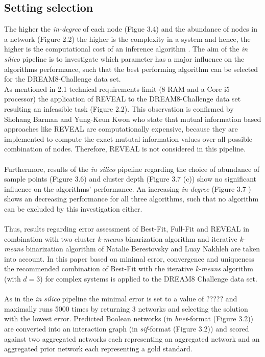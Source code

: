 \subsection*{Setting selection}
The higher the \textit{in-degree} of each node (Figue 3.4) and the abundance of nodes in a network (Figure 2.2) the higher is the complexity in a system and hence, the higher is the computational cost of an inference algorithm \citep{Barman.2017}. 
The aim of the \textit{in silico} pipeline is to investigate which parameter has a major influence on the algorithms performance, such that the best performing algorithm can be selected for the DREAM8-Challenge data set.\\
As mentioned in 2.1 technical requirements limit (8 RAM and a Core i5 processor) the application of REVEAL to the DREAM8-Challenge data set resulting an infeasible task (Figure 2.2). This observation is confirmed by Shohang Barman and Yung-Keun Kwon \citep{Barman.2017} who state that mutual information based approaches like REVEAL are computationally expensive, because they are implemented to compute the exact mututal information values over all possible combination of nodes. Therefore, REVEAL is not considered in this pipeline.\\\\

Furthermore, results of the \textit{in silico} pipeline regarding the choice of abundance of sample points (Figure 3.6) and cluster depth (Figure 3.7 (c)) show no significant influence on the algorithms' performance. An increasing \textit{in-degree} (Figure 3.7 ) shows an decreasing performance for all three algorithms, such that no algorithm can be excluded by this investigation either.\\\\
Thus, results regarding error assessment of Best-Fit, Full-Fit and REVEAL in combination with two cluster \textit{k-means} binarization algorithm and iterative \textit{k-means} binarization algorithm of Natalie Berestovsky and Luay Nakhleh are taken into account. In this paper based on minimal error, convergence and uniqueness the recommended combination of Best-Fit with the iterative \textit{k-means} algorithm (with $d=3$) for complex systems is applied to the DREAM8 Challenge data set.\\\\%
As in the \textit{in silico} pipeline the minimal error is set to a value of ????? and maximally runs 5000 times by returning 3 networks and selecting the solution with the lowest error. Predicted Boolean networks (in \textit{bnet}-format (Figure 3.2)) are converted into an interaction graph (in \textit{sif}-format (Figure 3.2)) and scored against two aggregated networks
each representing an aggregated network and an aggregated prior network each representing a gold standard.\\\\ 

